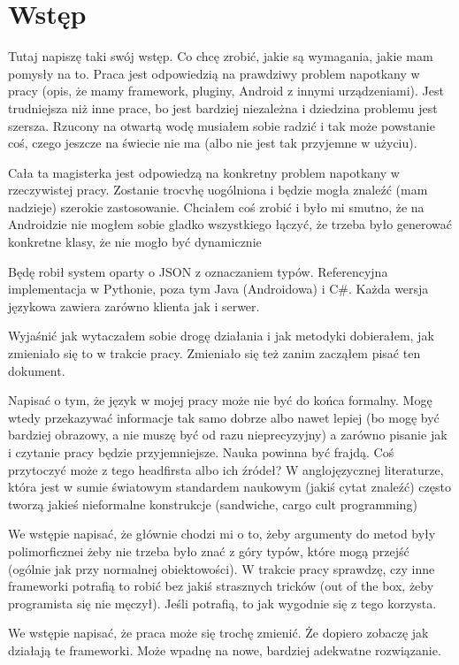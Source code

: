 \documentclass[twoside,a4paper]{book}
\begin{document}
\section{Wstęp}
Tutaj napiszę taki swój wstęp. Co chcę zrobić, jakie są wymagania, jakie mam pomysły na to.
Praca jest odpowiedzią na prawdziwy problem napotkany w pracy (opis, że mamy framework, pluginy, Android z innymi urządzeniami).
Jest trudniejsza niż inne prace, bo jest bardziej niezależna i dziedzina problemu jest szersza. Rzucony na otwartą wodę musiałem sobie radzić i tak może powstanie coś, czego jeszcze na świecie nie ma (albo nie jest tak przyjemne w użyciu).

Cała ta magisterka jest odpowiedzą na konkretny problem napotkany w rzeczywistej pracy. Zostanie trocvhę uogólniona i będzie mogła znaleźć (mam nadzieje) szerokie zastosowanie. Chciałem coś zrobić i było mi smutno, że na Androidzie nie mogłem sobie gladko wszystkiego łączyć, że trzeba było generować konkretne klasy, że nie mogło być dynamicznie

Będę robił system oparty o JSON z oznaczaniem typów. Referencyjna implementacja w Pythonie, poza tym Java (Androidowa) i C\#. Każda wersja językowa zawiera zarówno klienta jak i serwer.

Wyjaśnić jak wytaczałem sobie drogę działania i jak metodyki dobierałem, jak zmieniało się to w trakcie pracy. Zmieniało się też zanim zacząłem pisać ten dokument.

Napisać o tym, że język w mojej pracy może nie być do końca formalny. Mogę wtedy przekazywać informacje tak samo dobrze albo nawet lepiej (bo mogę być bardziej obrazowy, a nie muszę być od razu nieprecyzyjny) a zarówno pisanie jak i czytanie pracy będzie przyjemniejsze. Nauka powinna być frajdą. Coś przytoczyć może z tego headfirsta albo ich źródeł? W anglojęzycznej literaturze, która jest w sumie światowym standardem naukowym (jakiś cytat znaleźć) często tworzą jakieś nieformalne konstrukcje (sandwiche, cargo cult programming)

We wstępie napisać, że głównie chodzi mi o to, żeby argumenty do metod były polimorficznei żeby nie trzeba było znać z góry typów, które mogą przejść (ogólnie jak przy normalnej obiektowości). W trakcie pracy sprawdzę, czy inne frameworki potrafią to robić bez jakiś strasznych tricków (out of the box, żeby programista się nie męczył). Jeśli potrafią, to jak wygodnie się z tego korzysta.

We wstępie napisać, że praca może się trochę zmienić. Że dopiero zobaczę jak działają te frameworki. Może wpadnę na nowe, bardziej adekwatne rozwiązanie.
\end{document}
